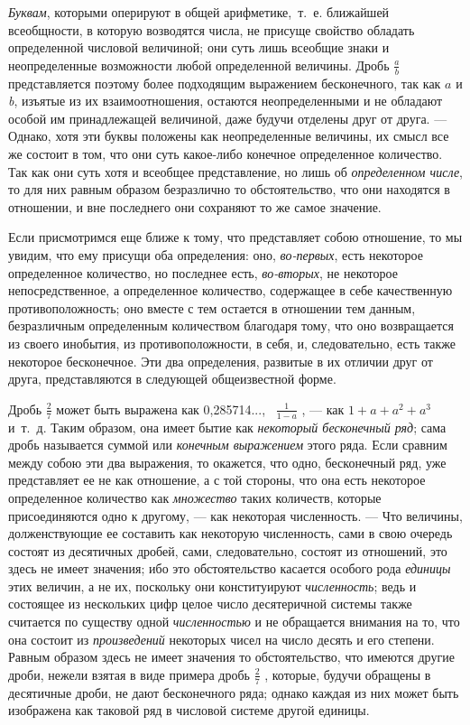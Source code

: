 {\em Буквам}, которыми оперируют в общей
арифметике,~т.~е. ближайшей всеобщности, в которую возводятся числа, не
присуще свойство обладать определенной числовой величиной; они суть лишь
всеобщие знаки и неопределенные возможности любой определенной величины.
Дробь  $\frac a b$  представляется поэтому более подходящим выражением
бесконечного, так как $a$ и
{\em b}, изъятые из их взаимоотношения, остаются
неопределенными и не обладают особой им принадлежащей величиной, даже
будучи отделены друг от друга. — Однако, хотя эти буквы положены как
неопределенные величины, их смысл все же состоит в том, что они суть
какое-либо конечное определенное количество. Так как они суть хотя и
всеобщее представление, но лишь об {\em определенном
числе}, то для них равным образом безразлично то обстоятельство, что они
находятся в отношении, и вне последнего они сохраняют то же самое значение.

Если присмотримся еще ближе к тому, что представляет собою отношение, то мы
увидим, что ему присущи оба определения: оно,
{\em во-первых}, есть некоторое определенное
количество, но последнее есть, {\em во-вторых}, не
некоторое непосредственное, а определенное количество, содержащее в себе
качественную противоположность; оно вместе с тем остается в отношении тем
данным, безразличным определенным количеством благодаря тому, что оно
возвращается из своего инобытия, из противоположности, в себя, и,
следовательно, есть также некоторое бесконечное. Эти два определения,
развитые в их отличии друг от друга, представляются в следующей
общеизвестной форме.

Дробь  $\frac 2 7$  может быть выражена как 0,285714..., \  $\frac 1{1-a}$ ,
— как  $1 + a + a^2 + a^3$  и~т.~д. Таким образом, она имеет бытие как
{\em некоторый бесконечный ряд}; сама дробь называется
суммой или {\em конечным выражением} этого ряда. Если
сравним между собою эти два выражения, то окажется, что одно, бесконечный
ряд, уже представляет ее не как отношение, а с той стороны, что она есть
некоторое определенное количество как {\em множество}
таких количеств, которые присоединяются одно к другому, — как некоторая
численность. — Что величины, долженствующие ее составить как некоторую
численность, сами в свою очередь состоят из десятичных дробей, сами,
следовательно, состоят из отношений, это здесь не имеет значения; ибо это
обстоятельство касается особого рода {\em единицы} этих
величин, а не их, поскольку они конституируют
{\em численность}; ведь и состоящее из нескольких цифр
целое число десятеричной системы также считается по существу одной
{\em численностью} и не обращается внимания на то, что
она состоит из {\em произведений} некоторых чисел на
число десять и его степени. Равным образом здесь не имеет значения то
обстоятельство, что имеются другие дроби, нежели взятая в виде примера
дробь  $\frac 2 7$ , которые, будучи обращены в десятичные дроби, не дают
бесконечного ряда; однако каждая из них может быть изображена как таковой
ряд в числовой системе другой единицы.

